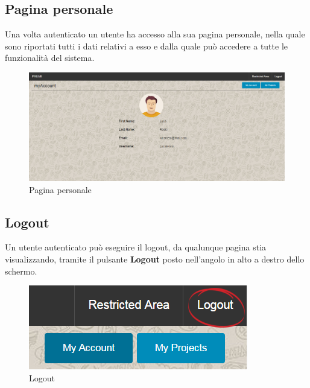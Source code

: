 \subsection{Pagina personale}
Una volta autenticato un utente ha accesso alla sua pagina personale, nella quale sono riportati tutti i dati relativi a esso e dalla quale può accedere a tutte le funzionalità del sistema.

\begin{figure}[H] 
	\centering 
	\includegraphics[scale=0.40] {img/myaccount.png}
	\caption{Pagina personale} 
\end{figure}

\subsection{Logout}
Un utente autenticato può eseguire il logout, da qualunque pagina stia visualizzando, tramite il pulsante \textbf{Logout} posto nell'angolo in alto a destro dello schermo.

\begin{figure}[H] 
	\centering 
	\includegraphics[scale=0.80] {img/logout.png}
	\caption{Logout} 
\end{figure}
